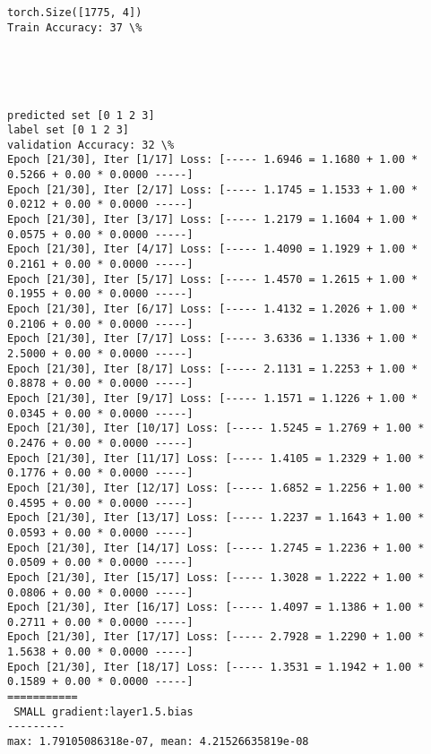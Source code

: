 \documentclass[11pt]{article}
\begin{document}
    \begin{Verbatim}[commandchars=\\\{\}]
torch.Size([1775, 4])
Train Accuracy: 37 \%

    \end{Verbatim}

    \begin{center}
    \end{center}
    { \hspace*{\fill} \\}
    
    \begin{center}
    \end{center}
    { \hspace*{\fill} \\}
    
    \begin{Verbatim}[commandchars=\\\{\}]
predicted set [0 1 2 3]
label set [0 1 2 3]
validation Accuracy: 32 \%
Epoch [21/30], Iter [1/17] Loss: [----- 1.6946 = 1.1680 + 1.00 * 0.5266 + 0.00 * 0.0000 -----]
Epoch [21/30], Iter [2/17] Loss: [----- 1.1745 = 1.1533 + 1.00 * 0.0212 + 0.00 * 0.0000 -----]
Epoch [21/30], Iter [3/17] Loss: [----- 1.2179 = 1.1604 + 1.00 * 0.0575 + 0.00 * 0.0000 -----]
Epoch [21/30], Iter [4/17] Loss: [----- 1.4090 = 1.1929 + 1.00 * 0.2161 + 0.00 * 0.0000 -----]
Epoch [21/30], Iter [5/17] Loss: [----- 1.4570 = 1.2615 + 1.00 * 0.1955 + 0.00 * 0.0000 -----]
Epoch [21/30], Iter [6/17] Loss: [----- 1.4132 = 1.2026 + 1.00 * 0.2106 + 0.00 * 0.0000 -----]
Epoch [21/30], Iter [7/17] Loss: [----- 3.6336 = 1.1336 + 1.00 * 2.5000 + 0.00 * 0.0000 -----]
Epoch [21/30], Iter [8/17] Loss: [----- 2.1131 = 1.2253 + 1.00 * 0.8878 + 0.00 * 0.0000 -----]
Epoch [21/30], Iter [9/17] Loss: [----- 1.1571 = 1.1226 + 1.00 * 0.0345 + 0.00 * 0.0000 -----]
Epoch [21/30], Iter [10/17] Loss: [----- 1.5245 = 1.2769 + 1.00 * 0.2476 + 0.00 * 0.0000 -----]
Epoch [21/30], Iter [11/17] Loss: [----- 1.4105 = 1.2329 + 1.00 * 0.1776 + 0.00 * 0.0000 -----]
Epoch [21/30], Iter [12/17] Loss: [----- 1.6852 = 1.2256 + 1.00 * 0.4595 + 0.00 * 0.0000 -----]
Epoch [21/30], Iter [13/17] Loss: [----- 1.2237 = 1.1643 + 1.00 * 0.0593 + 0.00 * 0.0000 -----]
Epoch [21/30], Iter [14/17] Loss: [----- 1.2745 = 1.2236 + 1.00 * 0.0509 + 0.00 * 0.0000 -----]
Epoch [21/30], Iter [15/17] Loss: [----- 1.3028 = 1.2222 + 1.00 * 0.0806 + 0.00 * 0.0000 -----]
Epoch [21/30], Iter [16/17] Loss: [----- 1.4097 = 1.1386 + 1.00 * 0.2711 + 0.00 * 0.0000 -----]
Epoch [21/30], Iter [17/17] Loss: [----- 2.7928 = 1.2290 + 1.00 * 1.5638 + 0.00 * 0.0000 -----]
Epoch [21/30], Iter [18/17] Loss: [----- 1.3531 = 1.1942 + 1.00 * 0.1589 + 0.00 * 0.0000 -----]
===========
 SMALL gradient:layer1.5.bias
---------
max: 1.79105086318e-07, mean: 4.21526635819e-08

    \end{Verbatim}
\end{document}
